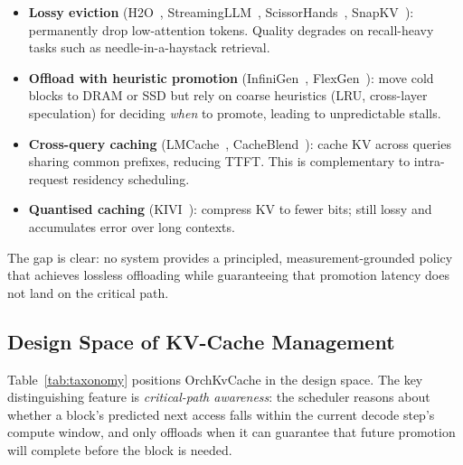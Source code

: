 \documentclass[acmsmall,nonacm,screen]{acmart}
\newcommand{\sys}{OrchKvCache}
\begin{document}
\begin{itemize}
  \item \textbf{Lossy eviction} (H2O~\cite{zhang2024h2o},
    StreamingLLM~\cite{xiao2024streamingllm},
    ScissorHands~\cite{liu2024scissorhands}, SnapKV~\cite{li2024snapkv}):
    permanently drop low-attention tokens.  Quality degrades on
    recall-heavy tasks such as needle-in-a-haystack retrieval.

  \item \textbf{Offload with heuristic promotion}
    (InfiniGen~\cite{lee2024infinigen}, FlexGen~\cite{sheng2023flexgen}):
    move cold blocks to DRAM or SSD but rely on coarse heuristics (LRU,
    cross-layer speculation) for deciding \emph{when} to promote, leading
    to unpredictable stalls.

  \item \textbf{Cross-query caching} (LMCache~\cite{yao2024lmcache},
    CacheBlend~\cite{yao2024cacheblend}): cache KV across queries sharing
    common prefixes, reducing TTFT.  This is complementary to intra-request
    residency scheduling.

  \item \textbf{Quantised caching} (KIVI~\cite{liu2024kivi}): compress KV to
    fewer bits; still lossy and accumulates error over long contexts.
\end{itemize}

The gap is clear: no system provides a principled, measurement-grounded
policy that achieves lossless offloading while guaranteeing that promotion
latency does not land on the critical path.

\subsection{Design Space of KV-Cache Management}\label{sec:bg:taxonomy}

Table~\ref{tab:taxonomy} positions \sys{} in the design space.  The key
distinguishing feature is \emph{critical-path awareness}: the scheduler
reasons about whether a block's predicted next access falls within the
current decode step's compute window, and only offloads when it can guarantee
that future promotion will complete before the block is needed.
\end{document}
